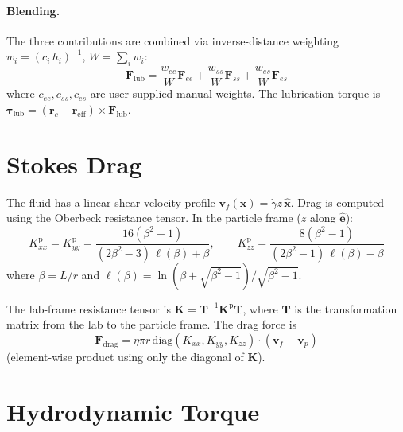 \documentclass[12pt]{article}
\newcommand{\bs}[1]{\boldsymbol{#1}}
\begin{document}
\paragraph{Blending.}  The three contributions are combined via inverse-distance
weighting $w_i = (c_i\, h_i)^{-1}$, $W = \sum_i w_i$:
\begin{equation}
  \bs{F}_\text{lub} = \frac{w_{ee}}{W}\bs{F}_{ee}
                    + \frac{w_{ss}}{W}\bs{F}_{ss}
                    + \frac{w_{es}}{W}\bs{F}_{es}
\end{equation}
where $c_{ee},c_{ss},c_{es}$ are user-supplied manual weights.
The lubrication torque is $\bs{\tau}_\text{lub} = (\bs{r}_c - \bs{r}_\text{eff})\times\bs{F}_\text{lub}$.

\section{Stokes Drag}

The fluid has a linear shear velocity profile $\bs{v}_f(\bs{x}) = \dot{\gamma}z\,\hat{\bs{x}}$.
Drag is computed using the Oberbeck resistance tensor.  In the particle frame ($z$ along $\hat{\bs{e}}$):
\begin{equation}
  K_{xx}^\text{p} = K_{yy}^\text{p} = \frac{16(\beta^2-1)}{(2\beta^2-3)\,\ell(\beta)+\beta},
  \qquad
  K_{zz}^\text{p} = \frac{8(\beta^2-1)}{(2\beta^2-1)\,\ell(\beta)-\beta}
\end{equation}
where $\beta = L/r$ and $\ell(\beta) = \ln(\beta+\sqrt{\beta^2-1})/\sqrt{\beta^2-1}$.

The lab-frame resistance tensor is $\bs{K} = \bs{T}^{-1}\bs{K}^\text{p}\bs{T}$,
where $\bs{T}$ is the transformation matrix from the lab to the particle frame.
The drag force is
\begin{equation}
  \bs{F}_\text{drag} = \eta\pi r\, \mathrm{diag}(K_{xx},K_{yy},K_{zz})\cdot(\bs{v}_f - \bs{v}_p)
\end{equation}
(element-wise product using only the diagonal of $\bs{K}$).

\section{Hydrodynamic Torque}
\end{document}
